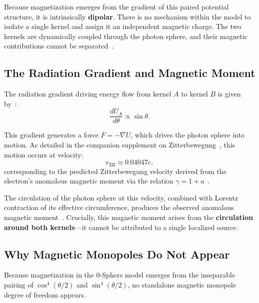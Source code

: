 \documentclass[12pt,letterpaper]{article}
\begin{document}
Because magnetization emerges from the gradient of this paired potential structure, it is intrinsically \textbf{dipolar}. There is no mechanism within the model to isolate a single kernel and assign it an independent magnetic charge. The two kernels are dynamically coupled through the photon sphere, and their magnetic contributions cannot be separated~\cite{hanamura18356895,hanamura18511664}.

\subsection{The Radiation Gradient and Magnetic Moment}

The radiation gradient driving energy flow from kernel $A$ to kernel $B$ is given by~\cite{hanamura18356895}:
\begin{equation}
\frac{dU_A}{d\theta} \propto \sin\theta.
\end{equation}

This gradient generates a force $F = -\nabla U$, which drives the photon sphere into motion. As detailed in the companion supplement on Zitterbewegung~\cite{hanamura18356895,hanamura18511664}, this motion occurs at velocity:
\begin{equation}
v_{\mathrm{ZB}} \approx 0.04047c,
\end{equation}
corresponding to the predicted Zitterbewegung velocity derived from the electron's anomalous magnetic moment via the relation $\gamma = 1 + a$~\cite{hanamura17765409}.

The circulation of the photon sphere at this velocity, combined with Lorentz contraction of its effective circumference, produces the observed anomalous magnetic moment~\cite{hanamura17765409,hanamura18511664}. Crucially, this magnetic moment arises from the \textbf{circulation around both kernels}---it cannot be attributed to a single localized source.

\subsection{Why Magnetic Monopoles Do Not Appear}

Because magnetization in the 0-Sphere model emerges from the inseparable pairing of $\cos^4(\theta/2)$ and $\sin^4(\theta/2)$, no standalone magnetic monopole degree of freedom appears.
\end{document}
